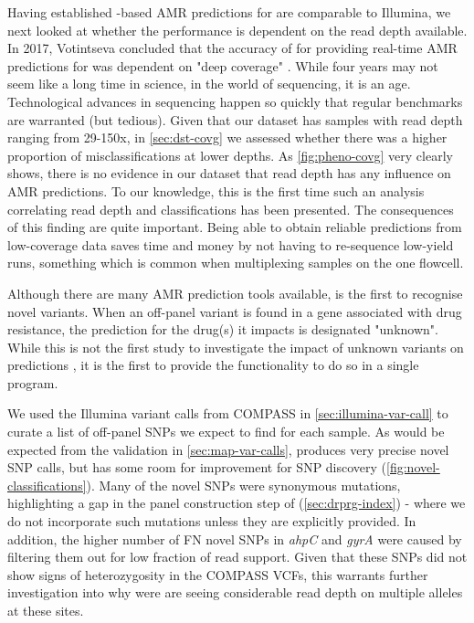 \noindent
Having established \ont{}-based AMR predictions for \mtb{} are comparable to Illumina, we next looked at whether the \ont{} performance is dependent on the read depth available. In 2017, Votintseva \etal{} concluded that the accuracy of \ont{} for providing real-time AMR predictions for \mtb{} was dependent on "deep coverage" \cite{Votintseva2017}. While four years may not seem like a long time in science, in the world of \ont{} sequencing, it is an age. Technological advances in \ont{} sequencing happen so quickly that regular benchmarks are warranted (but tedious). Given that our dataset has samples with read depth ranging from 29-150x, in \autoref{sec:dst-covg} we assessed whether there was a higher proportion of misclassifications at lower depths. As \autoref{fig:pheno-covg} very clearly shows, there is no evidence in our dataset that read depth has any influence on AMR predictions. To our knowledge, this is the first time such an analysis correlating read depth and classifications has been presented. The consequences of this finding are quite important. Being able to obtain reliable predictions from low-coverage data saves time and money by not having to re-sequence low-yield \ont{} runs, something which is common when multiplexing samples on the one flowcell.

\noindent
Although there are many \mtb{} AMR prediction tools available, \drprg{} is the first to recognise novel variants. When an off-panel variant is found in a gene associated with drug resistance, the prediction for the drug(s) it impacts is designated "unknown". While this is not the first study to investigate the impact of unknown variants on predictions \cite{cryptic2018,hunt2019}, it is the first to provide the functionality to do so in a single program.

We used the Illumina variant calls from COMPASS in \autoref{sec:illumina-var-call} to curate a list of off-panel SNPs we expect to find for each sample. As would be expected from the \pandora{} validation in \autoref{sec:map-var-calls}, \drprg{} produces very precise novel SNP calls, but has some room for improvement for SNP discovery (\autoref{fig:novel-classifications}). Many of the novel SNPs were synonymous mutations, highlighting a gap in the panel construction step of \drprg{} (\autoref{sec:drprg-index}) - where we do not incorporate such mutations unless they are explicitly provided. In addition, the higher number of FN novel SNPs in \textit{ahpC} and \textit{gyrA} were caused by \drprg{} filtering them out for low fraction of read support. Given that these SNPs did not show signs of heterozygosity in the COMPASS VCFs, this warrants further investigation into why were are seeing considerable read depth on multiple alleles at these sites.

